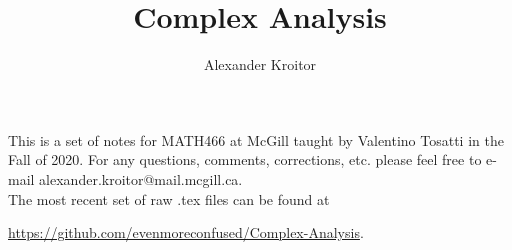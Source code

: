 \documentclass{notes}
\begin{document}
\author{Alexander Kroitor}

\begin{titlepage}
    \title{Complex Analysis}
    \maketitle
\end{titlepage}



\setcounter{lecnum}{0}
\setcounter{page}{1}
\tableofcontents

\begin{note}
This is a set of notes for MATH466 at McGill taught by Valentino Tosatti in the Fall of 2020. For any questions, comments, corrections, etc. please feel free to e-mail alexander.kroitor@mail.mcgill.ca.\\
 
The most recent set of raw .tex files can be found at
\begin{center}
    \url{https://github.com/evenmoreconfused/Complex-Analysis}.
\end{center}
\end{note}












 


















\end{document}
